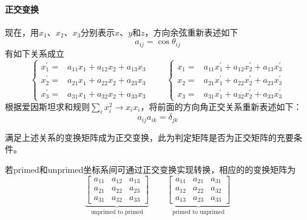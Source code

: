 \paragraph*{正交变换}
现在，用$x_1$、$x_2$、$x_3$分别表示$x$、$y$和$z$，方向余弦重新表述如下
\begin{equation}
	a_{ij} = \cos{\theta_{ij}}
\end{equation}
有如下关系成立
\begin{equation}
	\left\{\begin{aligned}
	x_1^{\prime} =& a_{11}x_1 + a_{12}x_2 + a_{13}x_3 \\
	x_2^{\prime} =& a_{21}x_1 + a_{22}x_2 + a_{23}x_3 \\
	x_3^{\prime} =& a_{31}x_1 + a_{32}x_2 + a_{33}x_3
	\end{aligned}\right. \qquad
	\left\{\begin{aligned}
		x_1 =& a_{11}x_1^{\prime} + a_{12}x_2^{\prime} + a_{13}x_3^{\prime} \\
		x_2 =& a_{21}x_1^{\prime} + a_{22}x_2^{\prime} + a_{23}x_3^{\prime} \\
		x_3 =& a_{31}x_1^{\prime} + a_{32}x_2^{\prime} + a_{33}x_3^{\prime}
	\end{aligned}\right.
\end{equation}
根据爱因斯坦求和规则$\sum_{i}x_i^2 \rightarrow x_i x_i$，将前面的方向角正交关系重新表述如下：
\begin{equation}
	a_{ij} a_{ik} = \delta_{jk}
\end{equation}
\begin{note}
	满足上述关系的变换矩阵成为正交变换，此为判定矩阵是否为正交矩阵的充要条件。
\end{note}

若primed和unprimed坐标系间可通过正交变换实现转换，相应的的变换矩阵为
\begin{equation}
	\underbrace{
	\begin{bmatrix}
		a_{11}	&	a_{12}	&	a_{13} \\
		a_{21}	&	a_{22}	&	a_{23} \\
		a_{31}	&	a_{32}	&	a_{33}
	\end{bmatrix}
	}_{\text{unprimed to primed}}
	\qquad
	\underbrace{
	\begin{bmatrix}
		a_{11}	&	a_{21}	&	a_{31} \\
		a_{12}	&	a_{22}	&	a_{32} \\
		a_{13}	&	a_{23}	&	a_{33}
	\end{bmatrix}
	}_{\text{primed to unprimed}}
\end{equation}

